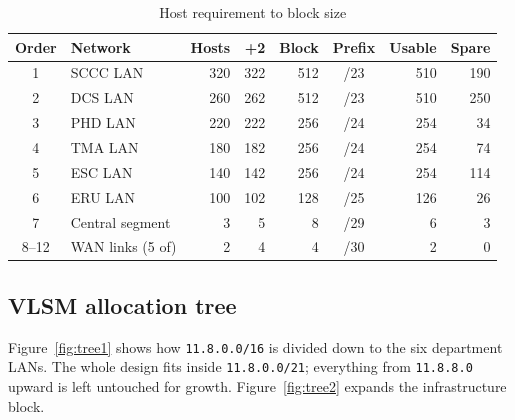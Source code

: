 \documentclass[11pt,a4paper]{article}
\newcommand{\netc}[1]{\texttt{\small #1}}
\begin{document}
\begin{table}[htbp]
\centering
\caption{Host requirement to block size}
\label{tab:sizing}
\small
\begin{tabular}{@{}clrrrcrr@{}}
\toprule
\textbf{Order} & \textbf{Network} & \textbf{Hosts} & \textbf{+2} & \textbf{Block} & \textbf{Prefix} & \textbf{Usable} & \textbf{Spare} \\
\midrule
1     & SCCC LAN            & 320 & 322 & 512 & /23 & 510 & 190 \\
2     & DCS LAN             & 260 & 262 & 512 & /23 & 510 & 250 \\
3     & PHD LAN             & 220 & 222 & 256 & /24 & 254 & 34 \\
4     & TMA LAN             & 180 & 182 & 256 & /24 & 254 & 74 \\
5     & ESC LAN             & 140 & 142 & 256 & /24 & 254 & 114 \\
6     & ERU LAN             & 100 & 102 & 128 & /25 & 126 & 26 \\
7     & Central segment     & 3   & 5   & 8   & /29 & 6   & 3 \\
8--12 & WAN links (5 of)    & 2   & 4   & 4   & /30 & 2   & 0 \\
\bottomrule
\end{tabular}
\end{table}

\noindent

\subsection{VLSM allocation tree}

Figure~\ref{fig:tree1} shows how \netc{11.8.0.0/16} is divided down to the six
department LANs. The whole design fits inside \netc{11.8.0.0/21}; everything
from \netc{11.8.8.0} upward is left untouched for growth.
Figure~\ref{fig:tree2} expands the infrastructure block.
\end{document}

